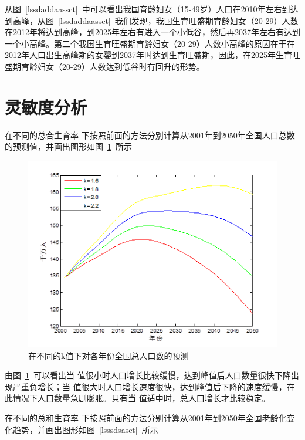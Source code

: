 \documentclass{whutmod}
\begin{document}
从图~\ref{lssdaddaassct}~中可以看出我国育龄妇女（15-49岁）人口在2010年左右到达到高峰，从图~\ref{lssdaddaassct}~我们发现，我国生育旺盛期育龄妇女（20-29）人数在2012年将达到高峰，到2025年左右有进入一个小低谷，然后再2037年左右有达到一个小高峰。第二个我国生育旺盛期育龄妇女（20-29）人数小高峰的原因在于在2012年人口出生高峰期的女婴到2037年时达到生育旺盛期，因此，在2025年生育旺盛期育龄妇女（20-29）人数达到低谷时有回升的形势。


\section{灵敏度分析}

在不同的总合生育率 下按照前面的方法分别计算从2001年到2050年全国人口总数的预测值，并画出图形如图~\ref{lssdassct}~所示


\begin{figure}[H]
	\centering
	\includegraphics[width=\textwidth]{figures/das.png}
	\caption{在不同的k值下对各年份全国总人口数的预测 }\label{lssdassct}
\end{figure}

由图~\ref{lssdassct}~可以看出当 值很小时人口增长比较缓慢，达到峰值后人口数量很快下降出现严重负增长；当 值很大时人口增长速度很快，达到峰值后下降的速度缓慢，在此情况下人口数量急剧膨胀。只有当 值适中时，总人口增长才比较稳定。


在不同的总和生育率 下按照前面的方法分别计算从2001年到2050年全国老龄化变化趋势，并画出图形如图~\ref{lsssdsasct}~所示
\end{document}
